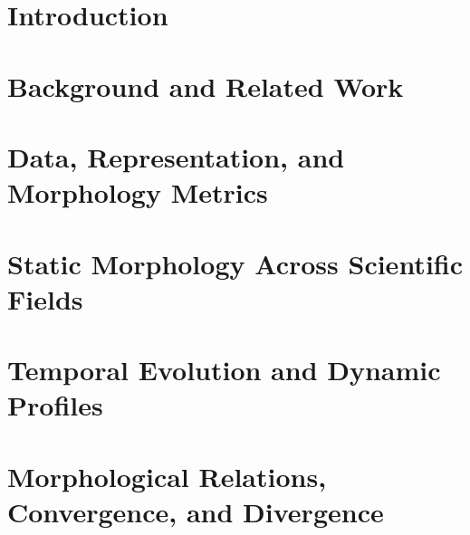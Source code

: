 \documentclass[12pt]{report} %
\begin{document}
\vfill
\clearpage


\tableofcontents
\thispagestyle{fancy}

\clearpage

\listoffigures
\thispagestyle{fancy}

\clearpage

\listoftables
\thispagestyle{fancy}

\clearpage


\clearpage
{} %

\chapter{Introduction}


\chapter{Background and Related Work}


\chapter{Data, Representation, and Morphology Metrics}


\chapter{Static Morphology Across Scientific Fields}


\chapter{Temporal Evolution and Dynamic Profiles}


\chapter{Morphological Relations, Convergence, and Divergence}

\end{document}
